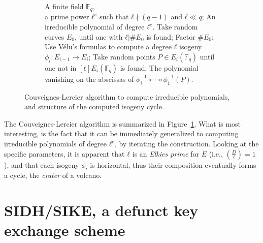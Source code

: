 \documentclass[10pt]{article}
\theoremstyle{plain}
\theoremstyle{definition}
\def\F{\ensuremath{\mathbb{F}}}
\begin{document}
\begin{prposition}
\begin{figure}
  \begin{subfigure}{0.65\textwidth}
    \begin{algorithmic}[1]
      \REQUIRE A finite field $\F_q$,\\
      a prime power $ℓ^e$ such that $ℓ\nmid(q-1)$ and $ℓ\ll q$;
      \ENSURE An irreducible polynomial of degree $ℓ^e$.
      \STATE Take random curves $E_0$, until one with $ℓ|\#E_0$ is found;
      \STATE Factor $\#E_0$;
      \STATE Use V\'elu's formulas to compute a degree $ℓ$ isogeny $ϕ_i:E_{i-1}\to E_i$;
      \ENDFOR
      \STATE Take random points $P\in E_i(\F_q)$ until one not in $[ℓ]E_i(\F_q)$ is found;
      \RETURN The polynomial vanishing on the abscissas of $ϕ_i^{-1}∘\cdots∘ϕ_1^{-1}(P)$.
    \end{algorithmic}
  \end{subfigure}
  \hfill
  \begin{subfigure}{0.2\textwidth}
  \end{subfigure}
  
  \caption{Couveignes-Lercier algorithm to compute irreducible
    polynomials, and structure of the computed isogeny cycle.}
  \label{fig:CL}
\end{figure}

The Couveignes-Lercier algorithm is summarized in
Figure~\ref{fig:CL}. %
What is most interesting, is the fact that it can be immediately
generalized to computing irreducible polynomials of degree $ℓ^e$, by
iterating the construction. %
Looking at the specific parameters, it is apparent that $ℓ$ is an
\emph{Elkies prime} for $E$ (i.e., $\left(\frac{D}{ℓ}\right)=1$), and
that each isogeny $ϕ_i$ is horizontal, thus their composition
eventually forms a cycle, the \emph{crater} of a volcano.


\section{SIDH/SIKE, a defunct key exchange scheme}
\label{sec:sidh}


\end{prposition}
\end{document}
